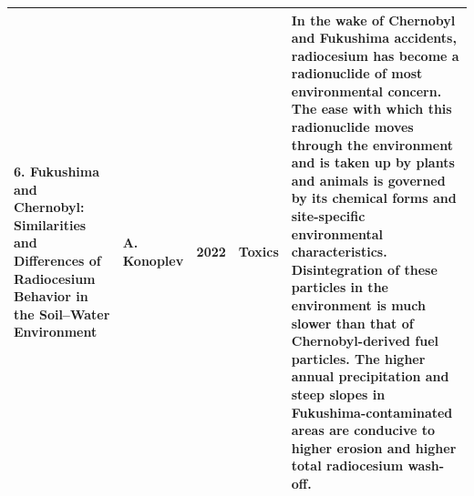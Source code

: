 \begin{table}[!t]
{\begin{tabular}{|p{3cm}|p{4cm}|p{1.5cm}|p{3cm}|p{6cm}|}
6.	Fukushima and Chernobyl: Similarities and Differences of Radiocesium Behavior in the Soil–Water Environment
& A. Konoplev
& 2022
& Toxics
& In the wake of Chernobyl and Fukushima accidents, radiocesium has become a radionuclide of most environmental concern. The ease with which this radionuclide moves through the environment and is taken up by plants and animals is governed by its chemical forms and site-specific environmental characteristics. Disintegration of these particles in the environment is much slower than that of Chernobyl-derived fuel particles. The higher annual precipitation and steep slopes in Fukushima-contaminated areas are conducive to higher erosion and higher total radiocesium wash-off. \\
\hline

\end{tabular}
}
\end{table}

